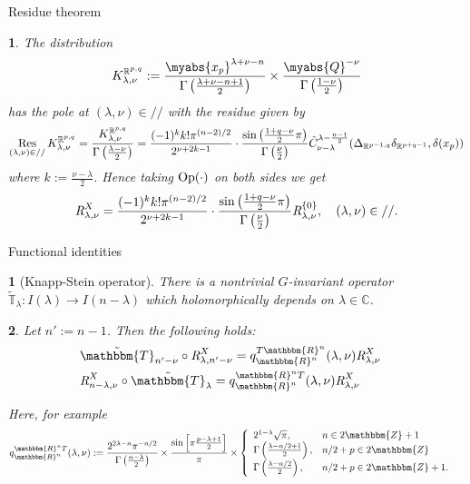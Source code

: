 \documentclass[8pt,notes,notheorems]{beamer}
\newcommand{\assign}{:=}
\newcommand{\Op}{\mbox{\normalfont Op}}
\newcommand{\Res}{\operatorname{Res}\displaylimits}
\newcommand{\OpR}{\mbox{\it R}}
\newtheorem{theorem}{\translate{Theorem}}[section]
\newtheorem{theorem}{\translate{Theorem}}
\newtheorem{fact}{\translate{Fact}}
\theoremstyle{definition}
\theoremstyle{example}
\theoremstyle{plain}
\theoremstyle{mystyle}
\begin{document}
\begin{frame}{Residue theorem}
	\begin{theorem}
		The distribution
		\[K_{\lambda,\nu}^{\mathbb{R}^{p,q}}:=\frac{\myabs{x_p}^{\lambda+\nu-n}}{\Gamma\left( \frac{\lambda+\nu-n+1}{2} \right)}\times
		\frac{\myabs{Q}^{-\nu}}{\Gamma\left( \frac{1-\nu}{2} \right)}\]
		has the pole at $(\lambda,\nu)\in//$ with the residue given by
		\[\Res_{(\lambda,\nu)\in//}K_{\lambda,\nu}^{\mathbb{R}^{p,q}}=\frac{K_{\lambda,\nu}^{\mathbb{R}^{p,q}}}{\Gamma\left( \frac{\lambda-\nu}{2} \right)}
			=\frac{ (- 1)^k k!\pi^{(n - 2) / 2} 
		}{2^{ \nu + 2 k-1}}\cdot  \frac{\sin\left( \frac{1+q-\nu}{2}\pi \right)}{\Gamma\left( \frac{\nu}{2} \right)}
	\tilde{C}_{\nu - \lambda}^{\lambda - \frac{n
  	- 1}{2}} ({\Delta}_{\mathbb{R}^{p-1,q}} {\delta}_{\mathbb{R}^{p+q-1}}, \delta (x_p))
		\]
		where $k:=\frac{\nu-\lambda}{2}$.
		Hence taking $\Op(\cdot)$ on both sides we get
  \[\OpR_{\lambda,\nu}^X  = \frac{ (- 1)^k k!\pi^{(n - 2) / 2} 
		}{2^{ \nu + 2 k-1}}\cdot  \frac{\sin\left( \frac{1+q-\nu}{2}\pi \right)}{\Gamma\left( \frac{\nu}{2} \right)}
     \OpR_{\lambda,\nu}^{ \left\{ 0 \right\} },\quad(\lambda,\nu)\in// . \]
	\end{theorem}
\end{frame}
\begin{frame}{Functional identities}
	\begin{fact}[Knapp-Stein operator]
		There is a nontrivial $G$-invariant operator $\tilde{\mathbb{T}}_{\lambda}:I(\lambda)\to I(n-\lambda)$ which holomorphically depends on $\lambda\in \mathbb{C}$.
	\end{fact}
	\begin{theorem}
		Let $n':=n-1$. Then the following holds:
\begin{eqnarray}
	& \tilde{\mathbbm{T}}_{n' - \nu} \circ \OpR^X_{\lambda,n'-\nu}= q^{T\mathbbm{R}^n}_{\mathbbm{R}^n} (\lambda,
  \nu) \OpR^X_{\lambda,\nu} &  \nonumber\\
  & \OpR^X_{n-\lambda,\nu} \circ
  \tilde{\mathbbm{T}}_{\lambda} = q^{\mathbbm{R}^n T}_{\mathbbm{R}^n}
  (\lambda, \nu) \OpR^X_{\lambda,\nu} & \nonumber
\end{eqnarray}

\pause
Here, for example
\begin{eqnarray}
  & q^{\mathbbm{R}^n T}_{\mathbbm{R}^n} (\lambda, \nu) \assign \frac{2^{2
  \lambda - n} \pi^{- n / 2}}{\Gamma \left( \frac{n - \lambda}{2} \right)}
  \times \frac{\sin \left[ \pi \frac{p - \lambda + 1}{2} \right]}{\pi} \times
  \left\{ \begin{array}{ll}
    2^{1 - \lambda} \sqrt{\pi}, & n \in 2\mathbbm{Z}+ 1\\
    \Gamma \left( \frac{\lambda - n / 2 + 1}{2} \right), & n / 2 + p \in
    2\mathbbm{Z}\\
    \Gamma \left( \frac{\lambda - n / 2}{2} \right), & n / 2 + p \in
    2\mathbbm{Z}+ 1.
  \end{array} \right. &  \nonumber
\end{eqnarray}
	\end{theorem}
\end{frame}
\end{document}
